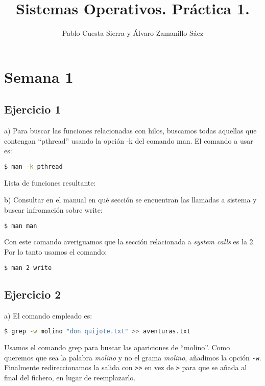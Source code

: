 \documentclass{article}
\title{Sistemas Operativos. Práctica 1.}
\author{Pablo Cuesta Sierra y Álvaro Zamanillo Sáez }
\date{}
\begin{document}
\maketitle


\section*{Semana 1}

\subsection*{Ejercicio 1}

a) Para buscar las funciones relacionadas con hilos, buscamos todas aquellas que contengan ``pthread'' usando la opción -k del comando man. El comando a usar es: 

\begin{lstlisting}[language=bash]
$ man -k pthread
\end{lstlisting}

Lista de funciones resultante: 



b) Consultar en el manual en qué sección se encuentran las llamadas a sistema y buscar infromación sobre write:

\begin{lstlisting}[language=bash]
$ man man
\end{lstlisting}

Con este comando averiguamos que la sección relacionada a \textit{system calls} es la 2. Por lo tanto usamos el comando:

\begin{lstlisting}[language=bash]
$ man 2 write
\end{lstlisting}

\subsection*{Ejercicio 2}

a) El comando empleado es: 

\begin{lstlisting}[language=bash]
$ grep -w molino "don quijote.txt" >> aventuras.txt
\end{lstlisting}

Usamos el comando grep para buscar las apariciones de ``molino''. Como queremos que sea la palabra \textit{molino} y no el grama \textit{molino}, añadimos la opción \texttt{-w}. Finalmente redireccionamos la salida con \texttt {>}\texttt {>} en vez de \texttt {>} para que se añada al final del fichero, en lugar de reemplazarlo.
\end{document}
